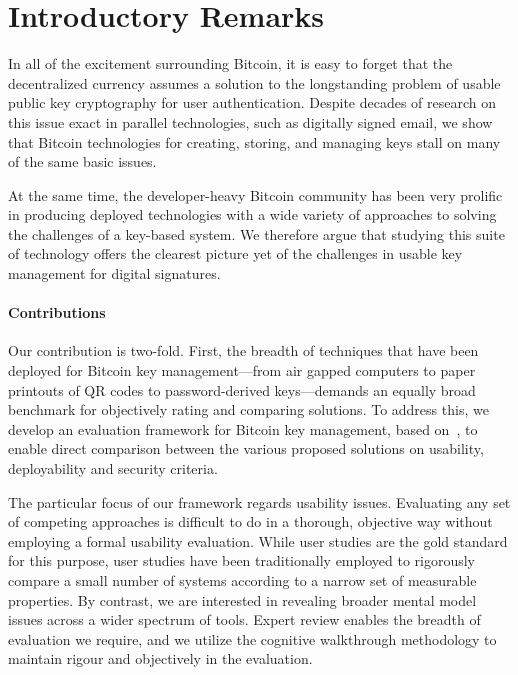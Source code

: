 

\section{Introductory Remarks}

In all of the excitement surrounding Bitcoin, it is easy to forget that the decentralized currency assumes a solution to the longstanding problem of usable public key cryptography for user authentication. Despite decades of research on this issue exact in parallel technologies, such as digitally signed email, we show that Bitcoin technologies for creating, storing, and managing keys stall on many of the same basic issues. 

At the same time, the developer-heavy Bitcoin community has been very prolific in producing deployed technologies with a wide variety of approaches to solving the challenges of a key-based system. We therefore argue that studying this suite of technology offers the clearest picture yet of the challenges in usable key management for digital signatures. 

\paragraph{Contributions}

Our contribution is two-fold. First, the breadth of techniques that have been deployed for Bitcoin key management---from air gapped computers to paper printouts of QR codes to password-derived keys---demands an equally broad benchmark for objectively rating and comparing solutions. To address this, we develop an evaluation framework for Bitcoin key management, based on~\cite{BHOS13}, to enable direct comparison between the various proposed solutions on usability, deployability and security criteria.

The particular focus of our framework regards usability issues. Evaluating any set of competing approaches is difficult to do in a thorough, objective way without employing a formal usability evaluation. While user studies are the gold standard for this purpose, user studies have been traditionally employed to rigorously compare a small number of systems according to a narrow set of measurable properties. By contrast, we are interested in revealing broader mental model issues across a wider spectrum of tools. Expert review enables the breadth of evaluation we require, and we utilize the cognitive walkthrough methodology to maintain rigour and objectively in the evaluation. 

